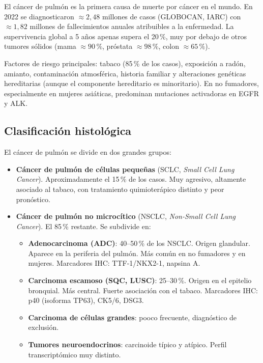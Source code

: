 \documentclass[11pt, a4paper]{article}
\begin{document}
El c\'ancer de pulm\'on es la primera causa de muerte por c\'ancer en el
mundo. En 2022 se diagnosticaron $\approx 2{,}48$ millones de casos
(GLOBOCAN, IARC) con $\approx 1{,}82$ millones de fallecimientos anuales
atribuibles a la enfermedad. La supervivencia global a 5 a\~nos apenas
supera el 20\,\%, muy por debajo de otros tumores s\'olidos (mama
$\approx 90\,\%$, pr\'ostata $\approx 98\,\%$, colon $\approx 65\,\%$).

Factores de riesgo principales: tabaco (85\,\% de los casos), exposici\'on
a rad\'on, amianto, contaminaci\'on atmosf\'erica, historia familiar y
alteraciones gen\'eticas hereditarias (aunque el componente hereditario
es minoritario). En no fumadores, especialmente en mujeres asi\'aticas,
predominan mutaciones activadoras en EGFR y ALK.

\subsection{Clasificaci\'on histol\'ogica}

El c\'ancer de pulm\'on se divide en dos grandes grupos:

\begin{itemize}[leftmargin=1.2em]
  \item \textbf{C\'ancer de pulm\'on de c\'elulas peque\~nas} (SCLC,
  \emph{Small Cell Lung Cancer}). Aproximadamente el 15\,\% de los casos.
  Muy agresivo, altamente asociado al tabaco, con tratamiento
  quimioter\'apico distinto y peor pron\'ostico.
  \item \textbf{C\'ancer de pulm\'on no microc\'itico} (NSCLC,
  \emph{Non-Small Cell Lung Cancer}). El 85\,\% restante. Se subdivide en:
  \begin{itemize}
    \item \textbf{Adenocarcinoma (ADC)}: 40--50\,\% de los NSCLC. Origen
    glandular. Aparece en la periferia del pulm\'on. M\'as com\'un en no
    fumadores y en mujeres. Marcadores IHC: TTF-1/NKX2-1, napsina A.
    \item \textbf{Carcinoma escamoso (SQC, LUSC)}: 25--30\,\%. Origen en
    el epitelio bronquial. M\'as central. Fuerte asociaci\'on con el
    tabaco. Marcadores IHC: p40 (isoforma TP63), CK5/6, DSG3.
    \item \textbf{Carcinoma de c\'elulas grandes}: pooco frecuente,
    diagn\'ostico de exclusi\'on.
    \item \textbf{Tumores neuroendocrinos}: carcinoide t\'ipico y
    at\'ipico. Perfil transcript\'omico muy distinto.
  \end{itemize}
\end{itemize}
\end{document}
